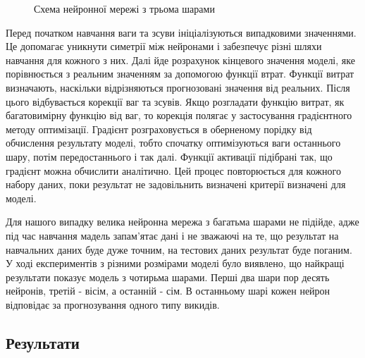 \begin{figure}[H]
\begin{center}
{
            }
            \caption{Схема нейронної мережі з трьома шарами}
    \end{center}
\end{figure}

Перед початком навчання ваги та зсуви ініціалізуються випадковими значеннями. 
Це допомагає уникнути симетрії між нейронами і забезпечує різні шляхи навчання для кожного з них. 
Далі йде розрахунок кінцевого значення моделі, яке порівнюється з реальним значенням за допомогою функції втрат. 
Функції витрат визначають, наскільки відрізняються прогнозовані значення від реальних. 
Після цього відбувається корекції ваг та зсувів. 
Якщо розгладати функцію витрат, як багатовимірну функцію від ваг, то корекція полягає у застосування градієнтного методу оптимізації. 
Градієнт розграховується в оберненому порідку від обчислення результату моделі, тобто спочатку оптимізуються ваги останнього шару, потім передостаннього і так далі. 
Функції активації підібрані так, що градієнт можна обчислити аналітично. 
Цей процес повторюється для кожного набору даних, поки результат не задовільнить визначені критерії визначені для моделі. 

Для нашого випадку велика нейронна мережа з багатьма шарами не підійде, адже під час навчання мадель запам'ятає дані і не зважаючі на те, що результат на навчальних даних буде дуже точним, на тестових даних результат буде поганим. 
У ході експериментів з різними розмірами моделі було виявлено, що найкращі результати показує модель з чотирьма шарами. 
Перші два шари пор десять нейронів, третій - вісім, а останній - сім. 
В останньому шарі кожен нейрон відповідає за прогнозування одного типу викидів. 

\subsection{Результати}

